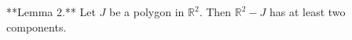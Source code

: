 **Lemma 2.** Let $J$ be a polygon in $\mathbb{R}^2$. Then $\mathbb{R}^2 - J$ has at least two components.
